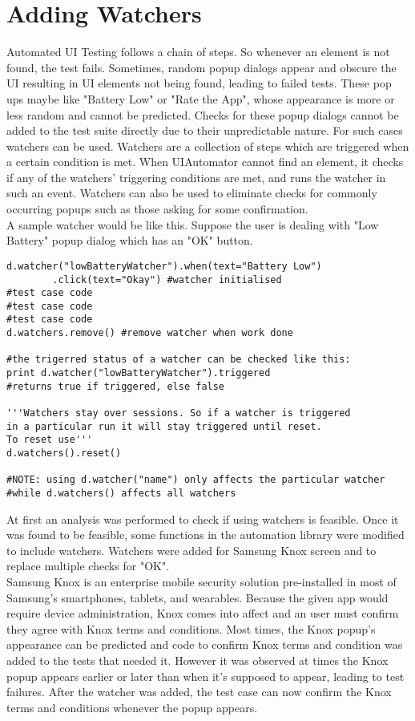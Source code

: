 \section{Adding Watchers}
Automated UI Testing follows a chain of steps. So whenever an element is not found, the test fails. Sometimes, random popup dialogs appear and obscure the UI resulting in UI elements not being found, leading to failed tests. These pop ups maybe like "Battery Low" or "Rate the App", whose appearance is more or less random and cannot be predicted. Checks for these popup dialogs cannot be added to the test suite directly due to their unpredictable nature. For such cases watchers can be used. Watchers are a collection of steps which are triggered when a certain condition is met. When UIAutomator cannot find an element, it checks if any of the watchers' triggering conditions are met, and runs the watcher in such an event\cite{uiautomatordoc}. Watchers can also be used to eliminate checks for commonly occurring popups such as those asking for some confirmation.\\

A sample watcher would be like this. Suppose the user is dealing with "Low Battery" popup dialog which has an "OK" button.

\begin{lstlisting}[style=PyStyle]
d.watcher("lowBatteryWatcher").when(text="Battery Low")
		.click(text="Okay") #watcher initialised
#test case code
#test case code
#test case code
d.watchers.remove() #remove watcher when work done

#the trigerred status of a watcher can be checked like this:
print d.watcher("lowBatteryWatcher").triggered 
#returns true if triggered, else false

'''Watchers stay over sessions. So if a watcher is triggered 
in a particular run it will stay triggered until reset. 
To reset use'''
d.watchers().reset()

#NOTE: using d.watcher("name") only affects the particular watcher 
#while d.watchers() affects all watchers
\end{lstlisting}

At first an analysis was performed to check if using watchers is feasible. Once it was found to be feasible, some functions in the automation library were modified to include watchers. Watchers were added for Samsung Knox screen and to replace multiple checks for "OK".\\ 

Samsung Knox is an enterprise mobile security solution pre-installed in most of Samsung's smartphones, tablets, and wearables. Because the given app would require device administration, Knox comes into affect and an user must confirm they agree with Knox terms and conditions. Most times, the Knox popup's appearance can be predicted and code to confirm Knox terms and condition was added to the tests that needed it. However it was observed at times the Knox popup appears earlier or later than when it's supposed to appear, leading to test failures. After the watcher was added, the test case can now confirm the Knox terms and conditions whenever the popup appears.\\

